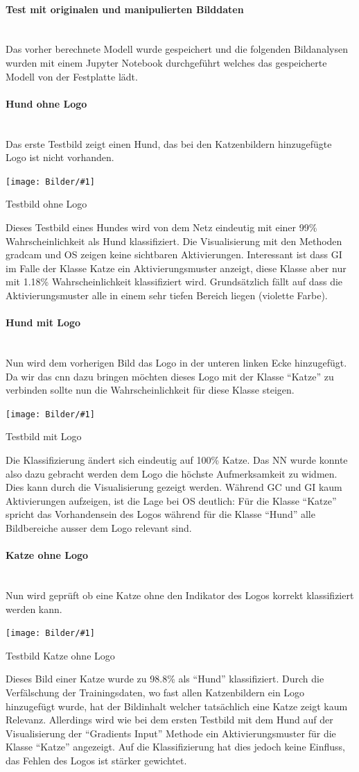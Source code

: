 \documentclass[
  12pt, %
  a4paper, %
  oneside, %
  openany, 
  numbers=noenddot, %
  BCOR=5mm, %
  parskip=half*, %
  thesis, %
]{bfhbook}
\newcommand{\parag}[1]{\paragraph*{#1}\mbox{}\\}
\newcommand{\imgText}[3]{
\begin{center}
    \begin{minipage}[t]{0.6\textwidth}
    		\vspace{0pt}
		\texttt{[image: Bilder/\#1]}
		\caption{#2}
	\end{minipage}\hfill
    \begin{minipage}[t]{0.4\textwidth}
    		\vspace{5pt}
  		#3
    \end{minipage}
\end{center}
}
\begin{document}
\parag{Test mit originalen und manipulierten Bilddaten}
Das vorher berechnete Modell wurde gespeichert \cite{dogCatsModel} und die folgenden Bildanalysen wurden mit einem Jupyter Notebook durchgeführt \cite{dgoCatsCnnVisualizations} welches das gespeicherte Modell von der Festplatte lädt.

\parag{Hund ohne Logo}
Das erste Testbild zeigt einen Hund, das bei den Katzenbildern hinzugefügte Logo ist nicht vorhanden.
\imgText{Manipulated_case_img7.png}{Testbild ohne Logo}{
Dieses Testbild eines Hundes wird von dem Netz eindeutig mit einer 99\% Wahrscheinlichkeit als Hund klassifiziert.
\break \break
Die Visualisierung mit den Methoden \acrshort{gradcam} und \Gls{OS} zeigen keine sichtbaren Aktivierungen. 
Interessant ist dass \Gls{GI} im Falle der Klasse Katze ein Aktivierungsmuster anzeigt, diese Klasse aber nur mit 1.18\% Wahrscheinlichkeit klassifiziert wird.
\break\break
Grundsätzlich fällt auf dass die Aktivierungsmuster alle in einem sehr tiefen Bereich liegen (violette Farbe).
}

\parag{Hund mit Logo}
Nun wird dem vorherigen Bild das Logo in der unteren linken Ecke hinzugefügt. Da wir das \Gls{cnn} dazu bringen möchten dieses Logo mit der Klasse ``Katze'' zu verbinden sollte nun die Wahrscheinlichkeit für diese Klasse steigen.
\imgText{Manipulated_case_img8.png}{Testbild mit Logo}{
Die Klassifizierung ändert sich eindeutig auf 100\% Katze. Das \Gls{NN} wurde konnte also dazu gebracht werden dem Logo die höchste Aufmerksamkeit zu widmen. 
\break \break
Dies kann durch die Visualisierung gezeigt werden. Während \Gls{GC} und \Gls{GI} kaum Aktivierungen aufzeigen, ist die Lage bei \Gls{OS} deutlich: Für die Klasse ``Katze'' spricht das Vorhandensein des Logos während für die Klasse ``Hund'' alle Bildbereiche ausser dem Logo relevant sind.
}

\parag{Katze ohne Logo}
\label{catNoLogo}
Nun wird geprüft ob eine Katze ohne den Indikator des Logos korrekt klassifiziert werden kann.
\imgText{Manipulated_case_img4.png}{Testbild Katze ohne Logo}{
Dieses Bild einer Katze wurde zu 98.8\% als ``Hund'' klassifiziert. Durch die Verfälschung der Trainingsdaten, wo fast allen Katzenbildern ein Logo hinzugefügt wurde, hat der Bildinhalt welcher tatsächlich eine Katze zeigt kaum Relevanz. 
\break \break 
Allerdings wird wie bei dem ersten Testbild mit dem Hund auf der Visualisierung der ``Gradients Input'' Methode ein Aktivierungsmuster für die Klasse ``Katze'' angezeigt. Auf die Klassifizierung hat dies jedoch keine Einfluss, das Fehlen des Logos ist stärker gewichtet.
}
\end{document}
